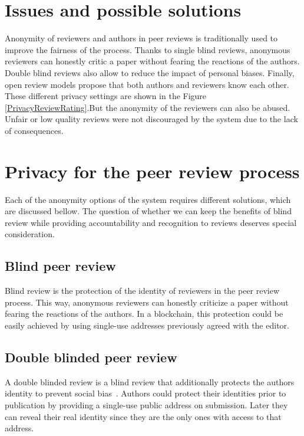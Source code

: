 \section{Issues and possible solutions}
\label{sec:privacyReview}


Anonymity of reviewers and authors in peer reviews is traditionally used to
improve the fairness of the process. Thanks to single blind reviews, anonymous
reviewers can honestly critic a paper without fearing the reactions of the
authors. Double blind reviews also allow to reduce the impact of personal
biases. Finally, open review models propose that both authors and reviewers know
each other. These different privacy settings are shown in the Figure
\ref{PrivacyReviewRating}.But the anonymity of the reviewers can also be abused.
Unfair or low quality reviews were not discouraged by the system due to the lack
of consequences.

\section{Privacy for the peer review process}


Each of the anonymity options of the system requires different solutions, which
are discussed bellow. The question of whether we can keep the benefits of blind
review while providing accountability and recognition to reviews deserves
special consideration.

\subsection*{Blind peer review}
Blind review is the protection of the identity of reviewers in the peer review
process. This way, anonymous reviewers can honestly criticize a paper without
fearing the reactions of the authors. In a blockchain, this protection could be
easily achieved by using single-use addresses previously agreed with the editor.

\subsection*{Double blinded peer review}
A double blinded review is a blind review that additionally protects the authors
identity to prevent social bias~\cite{lee2013bias,budden2008double}. Authors
could protect their identities prior to publication by providing a single-use
public address on submission. Later they can reveal their real identity since
they are the only ones with access to that address.


